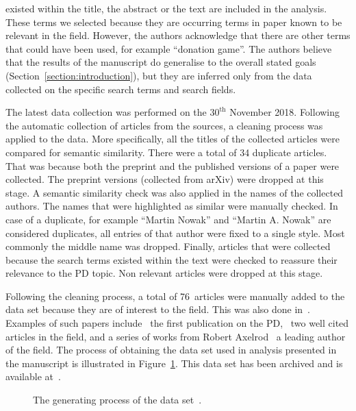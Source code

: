 \documentclass{article}
\theoremstyle{definition}
\newcommand{\manual}{76}
\begin{document}
existed within the title, the abstract or the text are included in the analysis.
These terms we selected because they are occurring terms in paper known to be
relevant in the field. However, the authors acknowledge that there are other
terms that could have been used, for example ``donation game''. The authors believe
that the results of the manuscript do generalise to the overall stated goals
(Section~\ref{section:introduction}), but they are inferred only from
the data collected on the specific search terms and search fields.

The latest data collection was performed on the \(30^{\text{th}}\) November
2018. Following the automatic collection of articles from the sources, a
cleaning process was applied to the data. More specifically, all the titles of
the collected articles were compared for semantic similarity. There were a total
of 34 duplicate articles. That was because both the preprint and the published
versions of a paper were collected. The preprint versions
(collected from arXiv) were dropped at this stage. A semantic similarity check
was also applied in the names of the collected authors. The names that were
highlighted as similar were manually checked. In case of a duplicate, for
example ``Martin Nowak'' and ``Martin A. Nowak'' are considered duplicates, all
entries of that author were fixed to a single style. Most commonly the middle
name was dropped. Finally, articles that were collected because the search terms
existed within the text were checked to reassure their relevance to the PD
topic. Non relevant articles were dropped at this stage. 

Following the cleaning process, a total of \manual~articles were manually added
to the data set because they are of interest to the field. This was also done
in~\citep{Liu2015}. Examples of such papers include~\citep{Flood1958} the first publication on the
PD,~\citep{Ohtsuki2006, Stewart2012} two well cited articles in the field, and a
series of works from Robert Axelrod~\citep{Axelrod1980, Axelrod1980more,
Axelrod1987, Axelrod1981, Riolo2001} a leading author of the field.
The process of obtaining the data set used in analysis presented in the
manuscript is illustrated in Figure~\ref{figure:colection_process}.
This data set has been archived and is available at~\citep{pd_data_2018}.

\begin{figure}[!hbtp]
    \begin{center}
        
    \end{center}
    \caption{The generating process of the data set~\citep{pd_data_2018}.}\label{figure:colection_process}
\end{figure}
\end{document}
